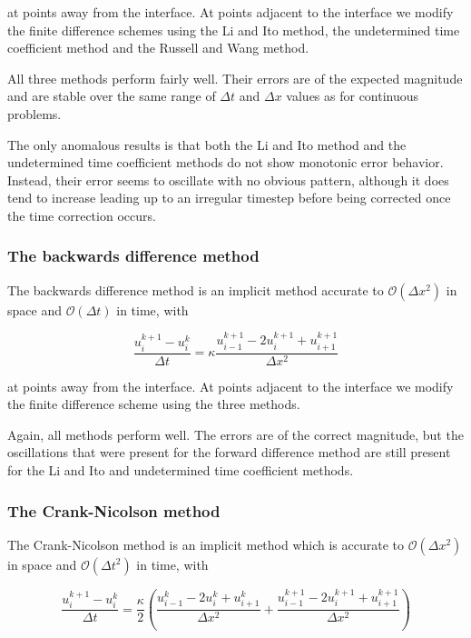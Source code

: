 at points away from the interface.
At points adjacent to the interface we modify the finite difference schemes using the Li and Ito method, the undetermined time coefficient method and the Russell and Wang method.

All three methods perform fairly well.
Their errors are of the expected magnitude and are stable over the same range of $\Delta t$ and $\Delta x$ values as for continuous problems.

The only anomalous results is that both the Li and Ito method and the undetermined time coefficient methods do not show monotonic error behavior.
Instead, their error seems to oscillate with no obvious pattern, although it does tend to increase leading up to an irregular timestep before being corrected once the time correction occurs.

\subsubsection{The backwards difference method}

The backwards difference method is an implicit method accurate to $\mathcal{O}(\Delta x^2)$ in space and $\mathcal{O}(\Delta t)$ in time, with

\begin{equation}
    \frac{u_i^{k+1} - u_i^k}{\Delta t} = \kappa \frac{u_{i-1}^{k+1} - 2 u_i^{k+1} + u_{i+1}^{k+1}}{\Delta x^2}
\end{equation}

at points away from the interface.
At points adjacent to the interface we modify the finite difference scheme using the three methods.

Again, all methods perform well.
The errors are of the correct magnitude, but the oscillations that were present for the forward difference method are still present for the Li and Ito and undetermined time coefficient methods.

\subsubsection{The Crank-Nicolson method}

The Crank-Nicolson method is an implicit method which is accurate to $\mathcal{O}(\Delta x^2)$ in space and $\mathcal{O}(\Delta t^2)$ in time, with

\begin{equation}
    \frac{u_i^{k+1} - u_i^k}{\Delta t} = \frac{\kappa}{2}\left(\frac{u_{i-1}^k - 2 u_i^k + u_{i+1}^k}{\Delta x^2} + \frac{u_{i-1}^{k+1} - 2 u_i^{k+1} + u_{i+1}^{k+1}}{\Delta x^2}\right)
\end{equation}

